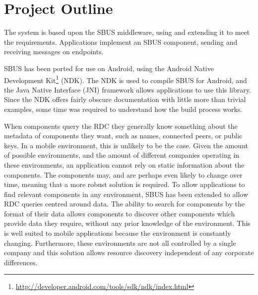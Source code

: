 \documentclass[12pt,twoside,notitlepage]{report}
\begin{document}
\section{Project Outline}

The system is based upon the SBUS middleware, using and extending it to meet the requirements. 
Applications implement an SBUS component, sending and receiving messages on endpoints. 

SBUS has been ported for use on Android, using the Android Native Development Kit\footnote{\url{http://developer.android.com/tools/sdk/ndk/index.html}} (NDK).
The NDK is used to compile SBUS for Android, and the Java Native Interface (JNI) framework allows applications to use this library. 
Since the NDK offers fairly obscure documentation with little more than trivial examples, some time was required to understand how the build process works. 

When components query the RDC they generally know something about the metadata of components they want, such as names, connected peers, or public keys. 
In a mobile environment, this is unlikely to be the case. 
Given the amount of possible environments, and the amount of different companies operating in these environments, an application cannot rely on static information about the components. 
The components may, and are perhaps even likely to change over time, meaning that a more robust solution is required. 
To allow applications to find relevant components in any environment, SBUS has been extended to allow RDC queries centred around data. 
The ability to search for components by the format of their data allows components to discover other components which provide data they require, without any prior knowledge of the environment. 
This is well suited to mobile applications because the environment is constantly changing. 
Furthermore, these environments are not all controlled by a single company and this solution allows resource discovery independent of any corporate differences. 
\end{document}
